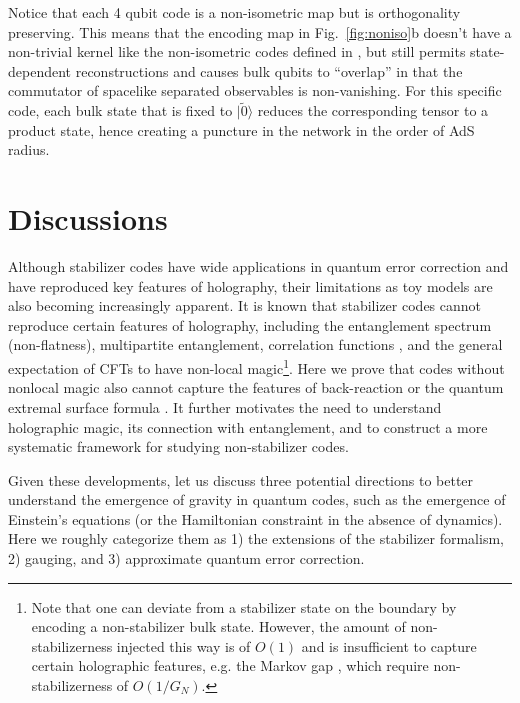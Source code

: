 \documentclass[%
 reprint,
superscriptaddress,
nofootinbib,
 amsmath,amssymb,
 aps,
prx,
floatfix,
]{revtex4-2}
\theoremstyle{definition}
\numberwithin{equation}{section}
\begin{document}
Notice that each 4 qubit code is a non-isometric map but is orthogonality preserving. This means that the encoding map in Fig.~\ref{fig:noniso}b doesn't have a non-trivial kernel like the non-isometric codes defined in \cite{AP2021,Akers:2022qdl}, but still permits state-dependent reconstructions and causes bulk qubits to ``overlap''\cite{OQ,OQdS,Caonote} in that the commutator of spacelike separated observables is non-vanishing. For this specific code, each bulk state that is fixed to $|\tilde{0}\rangle$ reduces the corresponding tensor to a product state, hence creating a puncture in the network in the order of AdS radius. 

\section{Discussions}
Although stabilizer codes have wide applications in quantum error correction and have reproduced key features of holography, their limitations as toy models are also becoming increasingly apparent. It is known that stabilizer codes cannot reproduce certain features of holography, including the entanglement spectrum (non-flatness), multipartite entanglement\cite{tripartite,markovgap}, correlation functions \cite{Pastawski:2015qua,Jahn:2019nmz,Jahn2022tensornetworkmodels}, and the general expectation of CFTs to have non-local magic\footnote{Note that one can deviate from a stabilizer state on the boundary by encoding a non-stabilizer bulk state. However, the amount of non-stabilizerness injected this way is of $O(1)$ and is insufficient to capture certain holographic features, e.g. the Markov gap \cite{markovgap}, which require non-stabilizerness of $O(1/G_N)$. }. Here we prove that codes without nonlocal magic also cannot capture the features of back-reaction or the quantum extremal surface formula \cite{Engelhardt:2014gca}. 
It further motivates the need to understand holographic magic\cite{White:2020zoz,Goto}, its connection with entanglement, and to construct a more systematic framework for studying non-stabilizer codes.

Given these developments, let us discuss three potential directions to better understand the emergence of gravity in quantum codes, such as the emergence of Einstein's equations (or the Hamiltonian constraint in the absence of dynamics). 
Here we roughly categorize them as 1) the extensions of the stabilizer formalism, 2) gauging, and 3) approximate quantum error correction. 
\end{document}
